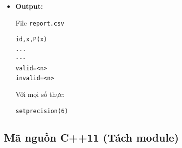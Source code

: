 \begin{itemize}
\begin{itemize}
        \begin{itemize}
            \item Hàm \texttt{readPoly()}
            \item Hàm \texttt{readX()}
            \item Hàm \texttt{writeReport()}
        \end{itemize}

        \item \textbf{Module Processing:}

        \begin{itemize}
            \item Hàm \texttt{evalHorner()}
            \item Dùng thuật toán Horner:
            \[
                P(x)=(((a_nx+a_{n-1})x+a_{n-2})\cdots)x+a_0
            \]
        \end{itemize}

    \end{itemize}

    \item \textbf{Output:}

    File \texttt{report.csv}

\begin{lstlisting}
id,x,P(x)
...
---
valid=<n>
invalid=<n>
\end{lstlisting}

    Với mọi số thực:
\begin{lstlisting}
setprecision(6)
\end{lstlisting}

\end{itemize}

\subsection{Mã nguồn C++11 (Tách module)}

